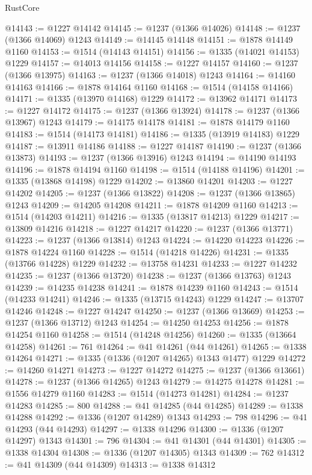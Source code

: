 \begin{lexlean}{RustCore}
\begin{coremodule}
@14143 := @1227 @14142
@14145 := @1237 (@1366 @14026)
@14148 := @1237 (@1366 @14069) @1243
@14149 := @14145 @14148
@14151 := @1878 @14149 @1160
@14153 := @1514 (@14143 @14151)
@14156 := @1335 (@14021 @14153) @1229
@14157 := @14013 @14156
@14158 := @1227 @14157
@14160 := @1237 (@1366 @13975)
@14163 := @1237 (@1366 @14018) @1243
@14164 := @14160 @14163
@14166 := @1878 @14164 @1160
@14168 := @1514 (@14158 @14166)
@14171 := @1335 (@13970 @14168) @1229
@14172 := @13962 @14171
@14173 := @1227 @14172
@14175 := @1237 (@1366 @13924)
@14178 := @1237 (@1366 @13967) @1243
@14179 := @14175 @14178
@14181 := @1878 @14179 @1160
@14183 := @1514 (@14173 @14181)
@14186 := @1335 (@13919 @14183) @1229
@14187 := @13911 @14186
@14188 := @1227 @14187
@14190 := @1237 (@1366 @13873)
@14193 := @1237 (@1366 @13916) @1243
@14194 := @14190 @14193
@14196 := @1878 @14194 @1160
@14198 := @1514 (@14188 @14196)
@14201 := @1335 (@13868 @14198) @1229
@14202 := @13860 @14201
@14203 := @1227 @14202
@14205 := @1237 (@1366 @13822)
@14208 := @1237 (@1366 @13865) @1243
@14209 := @14205 @14208
@14211 := @1878 @14209 @1160
@14213 := @1514 (@14203 @14211)
@14216 := @1335 (@13817 @14213) @1229
@14217 := @13809 @14216
@14218 := @1227 @14217
@14220 := @1237 (@1366 @13771)
@14223 := @1237 (@1366 @13814) @1243
@14224 := @14220 @14223
@14226 := @1878 @14224 @1160
@14228 := @1514 (@14218 @14226)
@14231 := @1335 (@13766 @14228) @1229
@14232 := @13758 @14231
@14233 := @1227 @14232
@14235 := @1237 (@1366 @13720)
@14238 := @1237 (@1366 @13763) @1243
@14239 := @14235 @14238
@14241 := @1878 @14239 @1160
@14243 := @1514 (@14233 @14241)
@14246 := @1335 (@13715 @14243) @1229
@14247 := @13707 @14246
@14248 := @1227 @14247
@14250 := @1237 (@1366 @13669)
@14253 := @1237 (@1366 @13712) @1243
@14254 := @14250 @14253
@14256 := @1878 @14254 @1160
@14258 := @1514 (@14248 @14256)
@14260 := @1335 (@13664 @14258)
@14261 := 761
@14264 := @41 @14261 (@44 @14261)
@14265 := @1338 @14264
@14271 := @1335 (@1336 (@1207 @14265) @1343 @1477) @1229
@14272 := @14260 @14271
@14273 := @1227 @14272
@14275 := @1237 (@1366 @13661)
@14278 := @1237 (@1366 @14265) @1243
@14279 := @14275 @14278
@14281 := @1556 @14279 @1160
@14283 := @1514 (@14273 @14281)
@14284 := @1237 @14283
@14285 := 800
@14288 := @41 @14285 (@44 @14285)
@14289 := @1338 @14288
@14292 := @1336 (@1207 @14289) @1343
@14293 := 798
@14296 := @41 @14293 (@44 @14293)
@14297 := @1338 @14296
@14300 := @1336 (@1207 @14297) @1343
@14301 := 796
@14304 := @41 @14301 (@44 @14301)
@14305 := @1338 @14304
@14308 := @1336 (@1207 @14305) @1343
@14309 := 762
@14312 := @41 @14309 (@44 @14309)
@14313 := @1338 @14312

\end{coremodule}
\end{lexlean}
